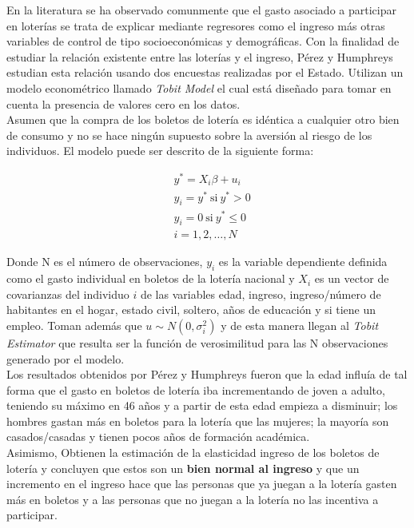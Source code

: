 En la literatura se ha observado comunmente que el gasto asociado a participar en loterías se trata de explicar mediante regresores como el ingreso más otras variables de control de tipo socioeconómicas y demográficas. Con la finalidad de estudiar la relación existente entre las loterías y el ingreso, Pérez y Humphreys estudian esta relación usando dos encuestas realizadas por el Estado. Utilizan un modelo econométrico llamado \textit{Tobit Model} el cual está diseñado para tomar en cuenta la presencia de valores cero en los datos. \\

Asumen que la compra de los boletos de lotería es idéntica a cualquier otro bien de consumo y no se hace ningún supuesto sobre la aversión al riesgo de los individuos. El modelo puede ser descrito de la siguiente forma: 

\begin{align*}
    & y^* = X_i \beta + u_i \\
    & y_i = y^* \ \text{si} \ y^* >0 \\
    & y_i = 0 \ \text{si} \ y^* \leq 0 \\
    & i = 1,2,\dots, N
\end{align*}

Donde N es el número de observaciones, $y_i$ es la variable dependiente definida como el gasto individual en boletos de la lotería nacional y $X_i$ es un vector de covarianzas del individuo $i$ de las variables edad, ingreso, ingreso/número de habitantes en el hogar, estado civil, soltero, años de educación y si tiene un empleo. Toman además que $u \sim N(0, \sigma^2_i)$ y de esta manera llegan al \textit{Tobit Estimator} que resulta ser la función de verosimilitud para las N observaciones generado por el modelo. \\

Los resultados obtenidos por Pérez y Humphreys fueron que la edad influía de tal forma que el gasto en boletos de lotería iba incrementando de joven a adulto, teniendo su máximo en 46 años y a partir de esta edad empieza a disminuir; los hombres gastan más en boletos para la lotería que las mujeres; la mayoría son casados/casadas y tienen pocos años de formación académica. \\

Asimismo, Obtienen la estimación de la elasticidad ingreso de los boletos de lotería y concluyen que estos son un \textbf{bien normal al ingreso} y que un incremento en el ingreso hace que las personas que ya juegan a la lotería gasten más en boletos y a las personas que no juegan a la lotería no las incentiva a participar.

